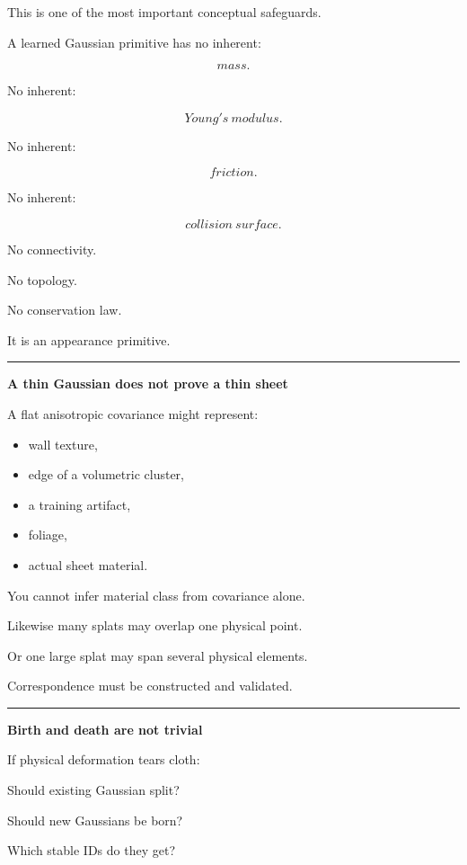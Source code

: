 This is one of the most important conceptual safeguards.

A learned Gaussian primitive has no inherent:

\[
mass.
\]

No inherent:

\[
Young's\ modulus.
\]

No inherent:

\[
friction.
\]

No inherent:

\[
collision\ surface.
\]

No connectivity.

No topology.

No conservation law.

It is an appearance primitive.

\begin{center}\rule{0.5\linewidth}{0.5pt}\end{center}

\textbf{A thin Gaussian does not prove a thin sheet}

A flat anisotropic covariance might represent:

\begin{itemize}
\tightlist
\item
  wall texture,
\item
  edge of a volumetric cluster,
\item
  a training artifact,
\item
  foliage,
\item
  actual sheet material.
\end{itemize}

You cannot infer material class from covariance alone.

Likewise many splats may overlap one physical point.

Or one large splat may span several physical elements.

Correspondence must be constructed and validated.

\begin{center}\rule{0.5\linewidth}{0.5pt}\end{center}

\textbf{Birth and death are not trivial}

If physical deformation tears cloth:

Should existing Gaussian split?

Should new Gaussians be born?

Which stable IDs do they get?

